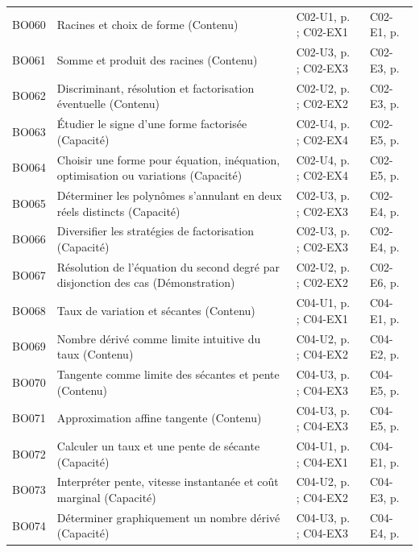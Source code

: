 \begin{longtable}{p{.1\linewidth}p{.43\linewidth}p{.19\linewidth}p{.16\linewidth}}
BO060 & Racines et choix de forme (Contenu) & C02-U1, p.\,\pageref{C02-U1} ; C02-EX1 & C02-E1, p.\,\pageref{C02-E1} \\
BO061 & Somme et produit des racines (Contenu) & C02-U3, p.\,\pageref{C02-U3} ; C02-EX3 & C02-E3, p.\,\pageref{C02-E3} \\
BO062 & Discriminant, résolution et factorisation éventuelle (Contenu) & C02-U2, p.\,\pageref{C02-U2} ; C02-EX2 & C02-E3, p.\,\pageref{C02-E3} \\
BO063 & Étudier le signe d’une forme factorisée (Capacité) & C02-U4, p.\,\pageref{C02-U4} ; C02-EX4 & C02-E5, p.\,\pageref{C02-E5} \\
BO064 & Choisir une forme pour équation, inéquation, optimisation ou variations (Capacité) & C02-U4, p.\,\pageref{C02-U4} ; C02-EX4 & C02-E5, p.\,\pageref{C02-E5} \\
BO065 & Déterminer les polynômes s’annulant en deux réels distincts (Capacité) & C02-U3, p.\,\pageref{C02-U3} ; C02-EX3 & C02-E4, p.\,\pageref{C02-E4} \\
BO066 & Diversifier les stratégies de factorisation (Capacité) & C02-U3, p.\,\pageref{C02-U3} ; C02-EX3 & C02-E4, p.\,\pageref{C02-E4} \\
BO067 & Résolution de l’équation du second degré par disjonction des cas (Démonstration) & C02-U2, p.\,\pageref{C02-U2} ; C02-EX2 & C02-E6, p.\,\pageref{C02-E6} \\
BO068 & Taux de variation et sécantes (Contenu) & C04-U1, p.\,\pageref{C04-U1} ; C04-EX1 & C04-E1, p.\,\pageref{C04-E1} \\
BO069 & Nombre dérivé comme limite intuitive du taux (Contenu) & C04-U2, p.\,\pageref{C04-U2} ; C04-EX2 & C04-E2, p.\,\pageref{C04-E2} \\
BO070 & Tangente comme limite des sécantes et pente (Contenu) & C04-U3, p.\,\pageref{C04-U3} ; C04-EX3 & C04-E5, p.\,\pageref{C04-E5} \\
BO071 & Approximation affine tangente (Contenu) & C04-U3, p.\,\pageref{C04-U3} ; C04-EX3 & C04-E5, p.\,\pageref{C04-E5} \\
BO072 & Calculer un taux et une pente de sécante (Capacité) & C04-U1, p.\,\pageref{C04-U1} ; C04-EX1 & C04-E1, p.\,\pageref{C04-E1} \\
BO073 & Interpréter pente, vitesse instantanée et coût marginal (Capacité) & C04-U2, p.\,\pageref{C04-U2} ; C04-EX2 & C04-E3, p.\,\pageref{C04-E3} \\
BO074 & Déterminer graphiquement un nombre dérivé (Capacité) & C04-U3, p.\,\pageref{C04-U3} ; C04-EX3 & C04-E4, p.\,\pageref{C04-E4} \\

\end{longtable}
